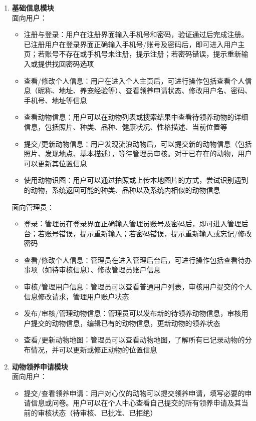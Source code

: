 \documentclass[12pt,a4paper,UTF8]{article}
\begin{document}
\begin{enumerate}
  \item \textbf{基础信息模块} \\
  面向用户：
  \begin{itemize}
    \item 注册与登录：用户在注册界面输入手机号和密码，验证通过后完成注册。已注册用户在登录界面正确输入手机号/账号及密码后，即可进入用户主页；若账号不存在或手机号未注册，提示注册；若密码错误，提示重新输入或提供找回密码选项
    \item 查看/修改个人信息：用户在进入个人主页后，可进行操作包括查看个人信息（昵称、地址、养宠经验等）、查看领养申请状态、修改用户名、密码、手机号、地址等信息
    \item 查看动物信息：用户可以在动物列表或搜索结果中查看待领养动物的详细信息，包括照片、种类、品种、健康状况、性格描述、当前位置等
    \item 提交/更新动物信息：用户发现流浪动物后，可以提交新的动物信息（包括照片、发现地点、基本描述），等待管理员审核。对于已存在的动物，用户可以更新其位置信息
    \item 使用动物识图：用户可以通过拍照或上传本地图片的方式，尝试识别遇到的动物，系统返回可能的种类、品种以及系统内相似的动物信息
  \end{itemize}
  面向管理员：
  \begin{itemize}
    \item 登录：管理员在登录界面正确输入管理员账号及密码后，即可进入管理后台；若账号错误，提示重新输入；若密码错误，提示重新输入或忘记/修改密码
    \item 查看/修改个人信息：管理员在进入管理后台后，可进行操作包括查看待办事项（如待审核信息）、修改管理员账户信息
    \item 审核/管理用户信息：管理员可以查看普通用户列表，审核用户提交的个人信息修改请求，管理用户账户状态
    \item 发布/审核/管理动物信息：管理员可以发布新的待领养动物信息，审核用户提交的动物信息，编辑已有的动物信息，更新动物的领养状态
    \item 查看/更新动物地图：管理员可以查看动物地图，了解所有已记录动物的分布情况，并可以更新或修正动物的位置信息
  \end{itemize}
  \item \textbf{动物领养申请模块} \\
  面向用户：
  \begin{itemize}
    \item 提交/查看领养申请：用户对心仪的动物可以提交领养申请，填写必要的申请信息或问卷。用户可以在个人中心查看自己提交的所有领养申请及其当前的审核状态（待审核、已批准、已拒绝）

\end{itemize}
\end{enumerate}
\end{document}

